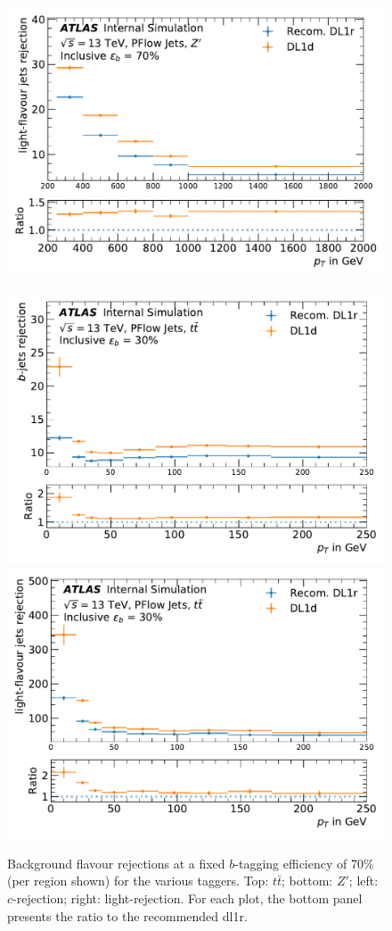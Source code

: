 \begin{center}
\begin{figure}[h!]
{\includegraphics[scale=0.425]{Images//FTAG/Reprocessed/plotting_eff_vs_pt/pT_vs_beff_u_zp_300.pdf}
}
\caption{Background flavour rejections at a fixed $b$-tagging efficiency of 70\% (per region shown) for the various taggers. Top: $t\bar{t}$; bottom: $Z'$; left: $c$-rejection; right: light-rejection. For each plot, the bottom panel presents the ratio to the recommended \gls{dl1r}.}
\label{fig:pt\gls{dl1d}tt}
\bigskip
\centerline{
\includegraphics[scale=0.425]{Images//FTAG/Reprocessed/plotting_eff_vs_pt_c/pT_vs_beff_c_tt_299.pdf}
\includegraphics[scale=0.425]{Images//FTAG/Reprocessed/plotting_eff_vs_pt_c/pT_vs_beff_u_tt_299.pdf}}

\end{figure}
\end{center}
